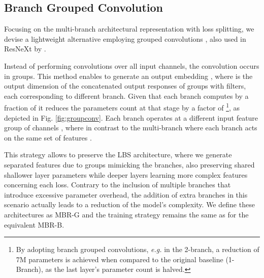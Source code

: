 \documentclass[letterpaper, 10pt, conference]{ieeeconf}
\begin{document}
\subsection{Branch Grouped Convolution}
Focusing on the multi-branch architectural representation with loss splitting, we devise a lightweight alternative employing grouped convolutions \cite{krizhevsky2017imagenet}, also used in ResNeXt by \cite{xie2017aggregated}. 

Instead of performing convolutions over all input channels, the convolution occurs in  groups. This method enables to generate an output embedding , where  is the output dimension of the concatenated output responses of  groups with  filters, each corresponding to different branch.
Given that each branch computes  by a fraction of  it reduces the parameters count at that stage by a factor of \footnote{By adopting branch grouped convolutions, \textit{e.g.} in the 2-branch, a reduction of 7M parameters is achieved when compared to the original baseline (1-Branch), as the last layer's parameter count is halved.}, as depicted in Fig. \ref{fig:groupconv}. 
Each branch  operates at a different input feature group of channels , where  in contrast to the multi-branch where each branch acts on the same set of features .



This strategy allows to preserve the LBS architecture, where we generate  separated features due to  groups mimicking the  branches, also preserving shared shallower layer parameters while deeper layers learning more complex features concerning each loss. Contrary to the inclusion of multiple  branches that introduce excessive parameter overhead, the addition of extra branches in this scenario actually leads to a reduction of the model's complexity. We define these architectures as MBR-G and the training strategy remains the same as for the equivalent MBR-B.
\end{document}
